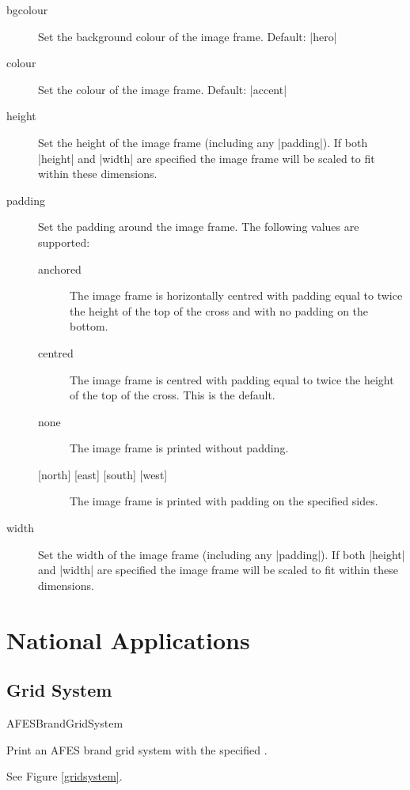 \documentclass[a4paper]{l3doc}
\begin{document}
\begin{description}
  \item[bgcolour] Set the background colour of the image frame. Default:
    |hero|
  \item[colour] Set the colour of the image frame. Default: |accent|
  \item[height] Set the height of the image frame (including any |padding|).
    If both |height| and |width| are specified the image frame will be scaled
    to fit within these dimensions.
  \item[padding] Set the padding around the image frame. The following values
    are supported:
    \begin{description}
      \item[anchored] The image frame is horizontally centred with padding
        equal to twice the height of the top of the cross and with no padding
        on the bottom.
      \item[centred] The image frame is centred with padding equal to twice
        the height of the top of the cross. This is the default.
      \item[none] The image frame is printed without padding.
      \item[{[north] [east] [south] [west]}] The image frame is printed with
        padding on the specified sides.
    \end{description}
  \item[width] Set the width of the image frame (including any |padding|).  If
    both |height| and |width| are specified the image frame will be scaled to
    fit within these dimensions.
\end{description}

\section{National Applications}

\subsection{Grid System}

\begin{function}{AFESBrandGridSystem}
  \begin{syntax}
  \end{syntax}
  Print an AFES brand grid system with the specified .

  See Figure \ref{gridsystem}.
\end{function}
\end{document}

